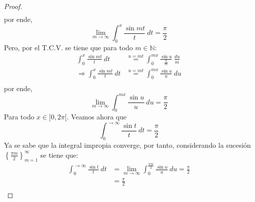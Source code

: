 \documentclass[12pt]{report}
\theoremstyle{largebreak}
\begin{document}
\begin{proof}
\begin{equation*}
\begin{split}
            \end{split}
        \end{equation*}
        por ende,
        \begin{equation*}
            \lim_{m\rightarrow\infty}\int_{0}^{x}\frac{\sin mt}{t}\:dt=\frac{\pi}{2}
        \end{equation*}
        Pero, por el T.C.V. se tiene que para todo $m\in\mathbb{N}$:
        \begin{equation*}
            \begin{split}
                \int_{0}^{x}\frac{\sin mt}{t}\:dt&\overset{u=mt}{=} \int_{0}^{mx}\frac{\sin u}{\frac{u}{m}}\: \frac{du}{m}\\
                \Rightarrow \int_{0}^{x}\frac{\sin mt}{t}\:dt&\overset{u=mt}{=} \int_{0}^{mx}\frac{\sin u}{u}\: du\\
            \end{split}
        \end{equation*}
        por ende,
        \begin{equation*}
            \lim_{m\rightarrow\infty}\int_{0}^{mx}\frac{\sin u}{u}\: du=\frac{\pi}{2}
        \end{equation*}
        Para todo $x\in]0,2\pi[$. Veamos ahora que
        \begin{equation*}
            \int_{0}^{\rightarrow\infty}\frac{\sin t}{t}\:dt=\frac{\pi}{2}
        \end{equation*}
        Ya se sabe que la integral impropia converge, por tanto, considerando la sucesión $\left\{\frac{\pi m}{2}\right\}_{ m=1}^\infty$ se tiene que:
        \begin{equation*}
            \begin{split}
                \int_{0}^{\rightarrow\infty}\frac{\sin t}{t}\:dt&=\lim_{m\rightarrow\infty}\int_{0}^{\frac{\pi m}{2}} \frac{\sin u}{u}\: du=\frac{\pi}{2}\\
                &=\frac{\pi}{2}\\
            \end{split}
        \end{equation*}
    \end{proof}
\end{document}
